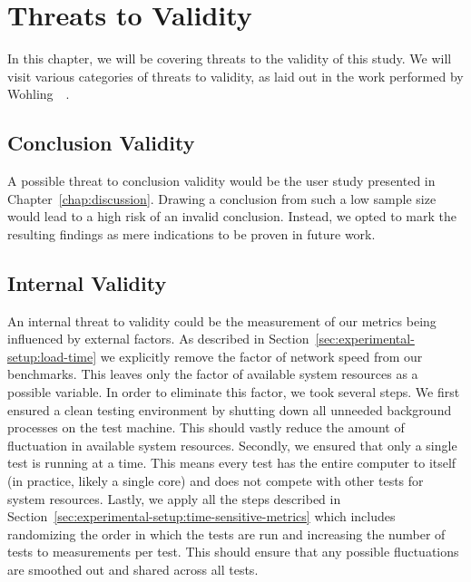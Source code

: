 \chapter{Threats to Validity}\label{chap:threats-to-validity}

In this chapter, we will be covering threats to the validity of this study. We will visit various categories of threats to validity, as laid out in the work performed by Wohling~\etal{}~\cite{alma9939160411205131}.

\section{Conclusion Validity}
A possible threat to conclusion validity would be the user study presented in Chapter~\ref{chap:discussion}. Drawing a conclusion from such a low sample size would lead to a high risk of an invalid conclusion. Instead, we opted to mark the resulting findings as mere indications to be proven in future work.

\section{Internal Validity}
An internal threat to validity could be the measurement of our metrics being influenced by external factors. As described in Section~\ref{sec:experimental-setup:load-time} we explicitly remove the factor of network speed from our benchmarks. This leaves only the factor of available system resources as a possible variable. In order to eliminate this factor, we took several steps. We first ensured a clean testing environment by shutting down all unneeded background processes on the test machine. This should vastly reduce the amount of fluctuation in available system resources. Secondly, we ensured that only a single test is running at a time. This means every test has the entire computer to itself (in practice, likely a single core) and does not compete with other tests for system resources. Lastly, we apply all the steps described in Section~\ref{sec:experimental-setup:time-sensitive-metrics} which includes randomizing the order in which the tests are run and increasing the number of tests to \numMeasures{} measurements per test. This should ensure that any possible fluctuations are smoothed out and shared across all tests.

